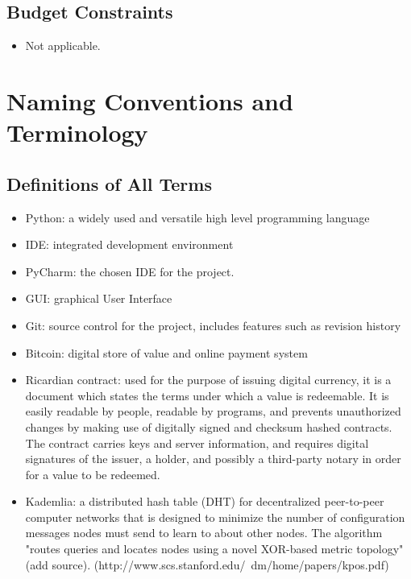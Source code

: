 \documentclass{article}
\begin{document}
\subsection{Budget Constraints}
\begin{itemize}
	
\item
Not applicable.
	
\end{itemize}

\section{Naming Conventions and Terminology}
\subsection{Definitions of All Terms}
\begin{itemize}
	
\item
Python: a widely used and versatile high level programming language
\item
IDE: integrated development environment
\item
PyCharm: the chosen IDE for the project.	
\item
GUI: graphical User Interface
\item
Git: source control for the project, includes features such as revision history
\item
Bitcoin: digital store of value and online payment system
\item
Ricardian contract: used for the purpose of issuing digital currency, it is a document which states the terms under which a value is redeemable. 
It is easily readable by people, readable by programs, and prevents unauthorized changes by making use of digitally signed and checksum hashed contracts. The contract carries keys and server information, and requires digital signatures of the issuer, a holder, and possibly a third-party notary in order for a value to be redeemed.
\item
Kademlia: a distributed hash table (DHT) for decentralized peer-to-peer computer networks that is designed to minimize the number of configuration  messages nodes must send to learn to about other nodes. The algorithm "routes queries and locates nodes using a novel XOR-based metric topology"(add source).
(http://www.scs.stanford.edu/~dm/home/papers/kpos.pdf)

\end{itemize}
\end{document}
